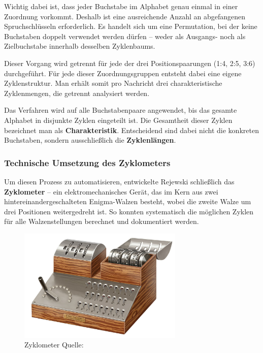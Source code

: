 \documentclass[12pt, ngerman, a4paper, numbers=noenddot]{article}
\begin{document}
Wichtig dabei ist, dass jeder Buchstabe im Alphabet genau einmal in einer Zuordnung vorkommt. Deshalb ist eine ausreichende Anzahl an abgefangenen Spruchschlüsseln erforderlich. Es handelt sich um eine Permutation, bei der keine Buchstaben doppelt verwendet werden dürfen – weder als Ausgangs- noch als Zielbuchstabe innerhalb desselben Zyklenbaums.


Dieser Vorgang wird getrennt für jede der drei Positionspaarungen (1:4, 2:5, 3:6) durchgeführt. Für jede dieser Zuordnungsgruppen entsteht dabei eine eigene Zyklenstruktur. Man erhält somit pro Nachricht drei charakteristische Zyklenmengen, die getrennt analysiert werden.

Das Verfahren wird auf alle Buchstabenpaare angewendet, bis das gesamte Alphabet in disjunkte Zyklen eingeteilt ist. Die Gesamtheit dieser Zyklen bezeichnet man als \textbf{Charakteristik}. Entscheidend sind dabei nicht die konkreten Buchstaben, sondern ausschließlich die \textbf{Zyklenlängen}.


\newpage
\subsubsection{Technische Umsetzung des Zyklometers}

Um diesen Prozess zu automatisieren, entwickelte Rejewski schließlich das \textbf{Zyklometer} – ein elektromechanisches Gerät, das im Kern aus zwei hintereinandergeschalteten Enigma-Walzen besteht, wobei die zweite Walze um drei Positionen weitergedreht ist. So konnten systematisch die möglichen Zyklen für alle Walzenstellungen berechnet und dokumentiert werden.


\begin{figure}[H]
	\centering
	\includegraphics[width=0.7\textwidth]{bilder/Zyklometer.jpg}
	\caption{Zyklometer Quelle: \cite{wiki:zyklometer}}
	\label{fig:Zyklometer}
\end{figure}
\end{document}
